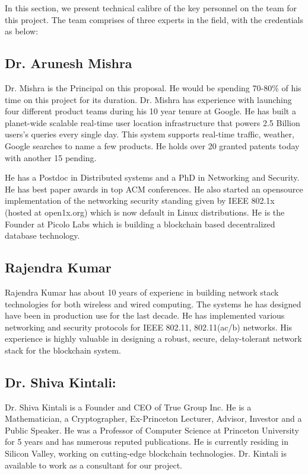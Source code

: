 \label{sec:pers}
In this section, we present technical calibre of the key personnel on the team for this project. The team comprises of
three experts in the field, with the credentials as below:

\subsection*{Dr. Arunesh Mishra}

Dr. Mishra is the Principal on this proposal. He would be spending 70-80\% of his time on this project for its duration.
Dr. Mishra has experience with launching four different product teams during his 10 year tenure at Google. He has built
a planet-wide scalable real-time user location infrastructure that powers 2.5 Billion users's queries every single day.
This system supports real-time traffic, weather, Google searches to name a few products. He holds over 20 granted
patents today with another 15 pending. 

He has a Postdoc in Distributed systems and a PhD in Networking and Security. He has best paper awards in top ACM
conferences. He also started an opensource implementation of the networking security standing given by IEEE 802.1x
(hosted at open1x.org) which is now default in Linux distributions. He is the Founder at Picolo Labs which is building a
blockchain based decentralized database technology.

\subsection*{Rajendra Kumar}

Rajendra Kumar has about 10 years of experienc in building network stack technologies for both wireless and wired
computing. The systems he has designed have been in production use for the last decade. He has implemented various
networking and security protocols for IEEE 802.11, 802.11(ac/b) networks. His experience is highly valuable in designing
a robust, secure, delay-tolerant network stack for the blockchain system.

\subsection*{Dr. Shiva Kintali:} 
Dr. Shiva Kintali is a Founder and CEO of True Group Inc. He is a Mathematician, a Cryptographer, Ex-Princeton Lecturer, Advisor,
Investor and a Public Speaker. He was a Professor of Computer Science at Princeton University for 5 years and has
numerous reputed publications. He is currently
residing in Silicon Valley, working on cutting-edge blockchain technologies. Dr. Kintali is available to work as a
consultant for our project.

